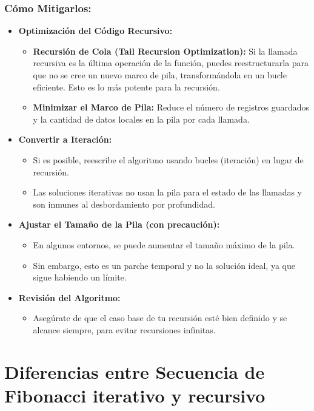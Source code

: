 \documentclass{article}
\begin{document}
\subsubsection*{Cómo Mitigarlos:}
\begin{itemize}
    \item \textbf{Optimización del Código Recursivo:}
    \begin{itemize}
        \item \textbf{Recursión de Cola (Tail Recursion Optimization):} Si la llamada recursiva es la última operación de la función, puedes reestructurarla para que no se cree un nuevo marco de pila, transformándola en un bucle eficiente. Esto es lo más potente para la recursión.
        \item \textbf{Minimizar el Marco de Pila:} Reduce el número de registros guardados y la cantidad de datos locales en la pila por cada llamada.
    \end{itemize}
    \item \textbf{Convertir a Iteración:}
    \begin{itemize}
        \item Si es posible, reescribe el algoritmo usando bucles (iteración) en lugar de recursión.
        \item Las soluciones iterativas no usan la pila para el estado de las llamadas y son inmunes al desbordamiento por profundidad.
    \end{itemize}
    \item \textbf{Ajustar el Tamaño de la Pila (con precaución):}
    \begin{itemize}
        \item En algunos entornos, se puede aumentar el tamaño máximo de la pila.
        \item Sin embargo, esto es un parche temporal y no la solución ideal, ya que sigue habiendo un límite.
    \end{itemize}
    \item \textbf{Revisión del Algoritmo:}
    \begin{itemize}
        \item Asegúrate de que el caso base de tu recursión esté bien definido y se alcance siempre, para evitar recursiones infinitas.
    \end{itemize}
\end{itemize}

\section*{Diferencias entre Secuencia de Fibonacci iterativo y recursivo}
\end{document}
